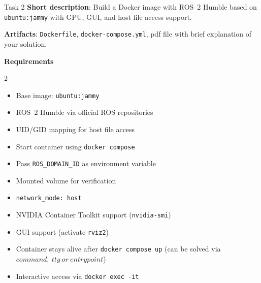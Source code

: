 \documentclass[aspectratio=169]{beamer}
\begin{document}
\begin{frame}[t]{Task 2}
\vspace{-0.3cm}
\textbf{Short description}:
Build a Docker image with ROS~2 Humble based on \texttt{ubuntu:jammy} with GPU, GUI, and host file access support.

\textbf{Artifacts}: \texttt{Dockerfile}, \texttt{docker-compose.yml}, pdf file with brief explanation of your solution.


\textbf{Requirements}
\footnotesize
\begin{multicols}{2}
\begin{itemize}
  \item Base image: \texttt{ubuntu:jammy}
  \item ROS~2 Humble via official ROS repositories
  \item UID/GID mapping for host file access
  \item Start container using \texttt{docker compose}
  \item Pass \texttt{ROS\_DOMAIN\_ID} as environment variable
  \item Mounted volume for verification
  \item \texttt{network\_mode: host}
  \item NVIDIA Container Toolkit support (\texttt{nvidia-smi})
  \item GUI support (activate \texttt{rviz2})
  \item Container stays alive after \texttt{docker compose up} (can be solved via $command,\ tty\ or\ entrypoint$)
  \item Interactive access via \texttt{docker exec -it}
\end{itemize}
\end{multicols}

\end{frame}
\end{document}
